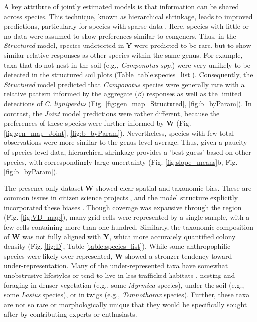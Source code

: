 \documentclass[preprint,final,times,12pt,3p]{elsarticle}
\begin{document}
A key attribute of jointly estimated models is that information can be shared across species. This technique, known as hierarchical shrinkage, leads to improved predictions, particularly for species with sparse data \citep{Fithian2015}. Here, species with little or no data were assumed to show preferences similar to congeners. Thus, in the \emph{Structured} model, species undetected in \textbf{Y} were predicted  to be rare, but to show similar relative responses as other species within the same genus. For example, taxa that do not nest in the soil (e.g., \emph{Camponotus spp.}) were very unlikely to be detected in the structured soil plots (Table \ref{table:species_list}). Consequently, the \emph{Structured} model  predicted that \emph{Camponotus} species were generally rare with a relative pattern informed by the aggregate ($\beta$) responses as well as the limited detections of \emph{C. ligniperdus} (Fig. \ref{fig:gen_map_Structured}, \ref{fig:b_byParam}). In contrast, the \emph{Joint} model predictions were rather different, because the preferences of these species were further informed by \textbf{W} (Fig. \ref{fig:gen_map_Joint}, \ref{fig:b_byParam}). Nevertheless, species with few total observations were more similar to the genus-level average. Thus, given a paucity of species-level data, hierarchical shrinkage provides a 'best guess' based on other species, with correspondingly large uncertainty (Fig. \ref{fig:slope_means}b, Fig. \ref{fig:b_byParam}).

The presence-only dataset \textbf{W} showed clear spatial and taxonomic bias. These are common issues in citizen science projects \citep{Ward2014,Theobald2015,Johnston2020,Robinson2020}, and the model structure explicitly incorporated these biases \citep{Isaac2014}. Though coverage was expansive through the region (Fig. \ref{fig:VD_map}), many grid cells were represented by a single sample, with a few cells containing more than one hundred. Similarly, the taxonomic composition of \textbf{W} was not fully aligned with \textbf{Y}, which more accurately quantified colony density (Fig. \ref{fig:D}, Table \ref{table:species_list}). While some anthropophilic species were likely over-represented, \textbf{W} showed a stronger tendency toward under-representation. Many of the under-represented taxa have somewhat unobstrusive lifestyles or tend to live in less trafficked habitats \citep{Seifert2018}, nesting and foraging in denser vegetation (e.g., some \emph{Myrmica} species), under the soil (e.g., some \emph{Lasius} species), or in twigs (e.g., \emph{Temnothorax} species). Further, these taxa are not so rare or morphologically unique that they would be specifically sought after by contributing experts or enthusiasts. 
\end{document}
